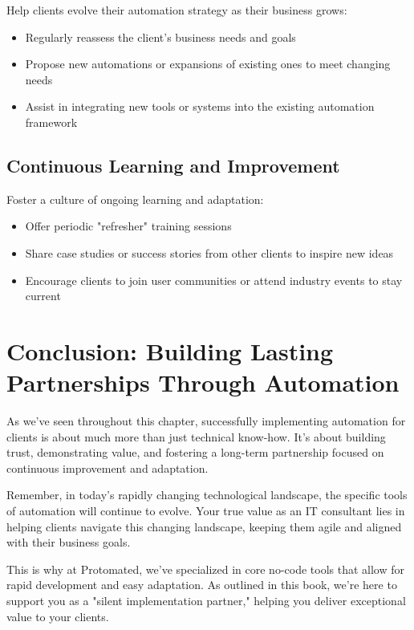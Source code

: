 Help clients evolve their automation strategy as their business grows:

\begin{itemize}
    \item Regularly reassess the client's business needs and goals
    \item Propose new automations or expansions of existing ones to meet changing needs
    \item Assist in integrating new tools or systems into the existing automation framework
\end{itemize}

\subsection{Continuous Learning and Improvement}

Foster a culture of ongoing learning and adaptation:

\begin{itemize}
    \item Offer periodic "refresher" training sessions
    \item Share case studies or success stories from other clients to inspire new ideas
    \item Encourage clients to join user communities or attend industry events to stay current
\end{itemize}

\section{Conclusion: Building Lasting Partnerships Through Automation}

As we've seen throughout this chapter, successfully implementing automation for clients is about much more than just technical know-how. It's about building trust, demonstrating value, and fostering a long-term partnership focused on continuous improvement and adaptation.

Remember, in today's rapidly changing technological landscape, the specific tools of automation will continue to evolve. Your true value as an IT consultant lies in helping clients navigate this changing landscape, keeping them agile and aligned with their business goals.

This is why at Protomated, we've specialized in core no-code tools that allow for rapid development and easy adaptation. As outlined in this book, we're here to support you as a "silent implementation partner," helping you deliver exceptional value to your clients.

